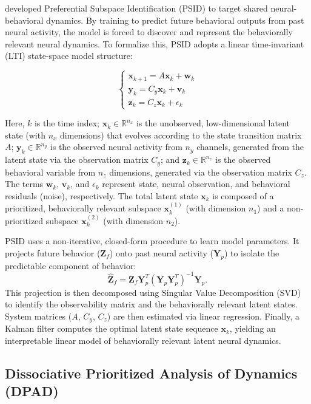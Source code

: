 \documentclass[12pt, letterpaper]{article}
\begin{document}
\textcite{saniModelingBehaviorallyRelevant2021} developed Preferential Subspace Identification (PSID) to target shared neural-behavioral dynamics. By training to predict future behavioral outputs from past neural activity, the model is forced to discover and represent the behaviorally relevant neural dynamics. To formalize this, PSID adopts a linear time-invariant (LTI) state-space model structure:

$$
\begin{cases}
\mathbf{x}_{k+1} = A \mathbf{x}_k + \mathbf{w}_k \\
\mathbf{y}_k = C_y \mathbf{x}_k + \mathbf{v}_k \\
\mathbf{z}_k = C_z \mathbf{x}_k + \epsilon_k
\end{cases}
$$

Here, $k$ is the time index; $\mathbf{x}_k \in \mathbb{R}^{n_x}$ is the unobserved, low-dimensional latent state (with $n_x$ dimensions) that evolves according to the state transition matrix $A$; $\mathbf{y}_k \in \mathbb{R}^{n_y}$ is the observed neural activity from $n_y$ channels, generated from the latent state via the observation matrix $C_y$; and $\mathbf{z}_k \in \mathbb{R}^{n_z}$ is the observed behavioral variable from $n_z$ dimensions, generated via the observation matrix $C_z$. The terms $\mathbf{w}_k$, $\mathbf{v}_k$, and $\epsilon_k$ represent state, neural observation, and behavioral residuals (noise), respectively. The total latent state $\mathbf{x}_k$ is composed of a prioritized, behaviorally relevant subspace $\mathbf{x}_k^{(1)}$ (with dimension $n_1$) and a non-prioritized subspace $\mathbf{x}_k^{(2)}$ (with dimension $n_2$).

PSID uses a non-iterative, closed-form procedure to learn model parameters. It projects future behavior ($\mathbf{Z}_f$) onto past neural activity ($\mathbf{Y}_p$) to isolate the predictable component of behavior:
$$\hat{\mathbf{Z}}_f = \mathbf{Z}_f \mathbf{Y}_p^T (\mathbf{Y}_p \mathbf{Y}_p^T)^{-1} \mathbf{Y}_p.$$
This projection is then decomposed using Singular Value Decomposition (SVD) to identify the observability matrix and the behaviorally relevant latent states. System matrices ($A$, $C_y$, $C_z$) are then estimated via linear regression. Finally, a Kalman filter computes the optimal latent state sequence $\mathbf{x}_k$, yielding an interpretable linear model of behaviorally relevant latent neural dynamics.


\subsection{Dissociative Prioritized Analysis of Dynamics (DPAD)}
\end{document}
